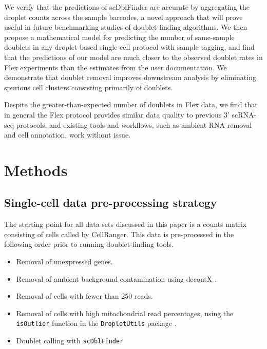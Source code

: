 \documentclass[unnumsec,webpdf,modern,large]{oup-authoring-template}
\begin{document}
	We verify that the predictions of scDblFinder are accurate by aggregating the droplet counts across the sample barcodes, a novel approach that will prove useful in future benchmarking studies of doublet-finding algorithms. 
	We then propose a mathematical model for predicting the number of same-sample doublets in any droplet-based single-cell protocol with sample tagging, and find that the predictions of our model are much closer to the observed doublet rates in Flex experiments than the estimates from the user documentation. 
	We demonstrate that doublet removal improves downstream analysis by eliminating spurious cell clusters consisting primarily of doublets.
	
	Despite the greater-than-expected number of doublets in Flex data, we find that in general the Flex protocol provides similar data quality to previous 3’ scRNA-seq protocols, and existing tools and workflows, such as ambient RNA removal and cell annotation, work without issue. 
	
	
	\section{Methods}
	\label{sec:methods}
	
	\subsection{Single-cell data pre-processing strategy}
	\label{subsec:preprocessing}
	
	The starting point for all data sets discussed in this paper is a counts matrix consisting of cells called by CellRanger. This data is pre-processed in the following order prior to running doublet-finding tools. 
	\begin{itemize}
		\item Removal of unexpressed genes.
		\item Removal of ambient background contamination using decontX 
		\citep{Yang2020}.
		\item Removal of cells with fewer than 250 reads.
		\item Removal of cells with high mitochondrial read percentages, using the \texttt{isOutlier} function in the \texttt{DropletUtils} package
		\citep{Griffiths2018, Lun2019}.		
		\item Doublet calling with \texttt{scDblFinder}
		\citep{Germain2021}
	\end{itemize} 
	
	
	
\end{document}
